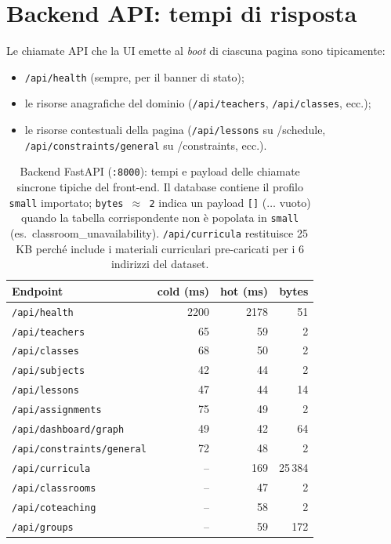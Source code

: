 \section{Backend API: tempi di risposta}

Le chiamate API che la UI emette al \emph{boot} di ciascuna
pagina sono tipicamente:

\begin{itemize}
\item \texttt{/api/health} (sempre, per il banner di stato);
\item le risorse anagrafiche del dominio
  (\texttt{/api/teachers}, \texttt{/api/classes}, ecc.);
\item le risorse contestuali della pagina
  (\texttt{/api/lessons} su /schedule,
  \texttt{/api/constraints/general} su /constraints, ecc.).
\end{itemize}

\begin{table}[h]
\centering\sffamily\small
\begin{tabular}{lrrr}
\toprule
Endpoint                          & cold (ms) & hot (ms) & bytes \\
\midrule
\texttt{/api/health}              & 2200 & 2178  & 51 \\
\texttt{/api/teachers}            &   65 &   59  &   2 \\
\texttt{/api/classes}             &   68 &   50  &   2 \\
\texttt{/api/subjects}            &   42 &   44  &   2 \\
\texttt{/api/lessons}             &   47 &   44  &  14 \\
\texttt{/api/assignments}         &   75 &   49  &   2 \\
\texttt{/api/dashboard/graph}     &   49 &   42  &  64 \\
\texttt{/api/constraints/general} &   72 &   48  &   2 \\
\texttt{/api/curricula}           &  --  &  169  & 25\,384 \\
\texttt{/api/classrooms}          &  --  &   47  &   2 \\
\texttt{/api/coteaching}          &  --  &   58  &   2 \\
\texttt{/api/groups}              &  --  &   59  & 172 \\
\bottomrule
\end{tabular}
\caption{Backend FastAPI (\texttt{:8000}): tempi e payload
delle chiamate sincrone tipiche del front-end. Il database
contiene il profilo \texttt{small} importato; \texttt{bytes
$\approx$ 2} indica un payload \texttt{[]} ($\dots$ vuoto)
quando la tabella corrispondente non \`e popolata in
\texttt{small} (es.\ classroom\_unavailability).
\texttt{/api/curricula} restituisce 25\,KB perch\'e include
i materiali curriculari pre-caricati per i 6 indirizzi del
dataset.}
\label{tab:ui-backend-times}
\end{table}

